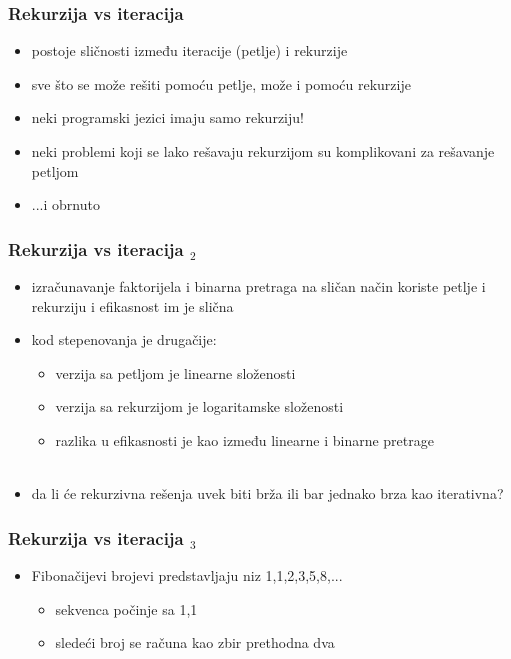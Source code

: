 \documentclass[utf8,compress]{beamer}
\begin{document}
\begin{frame}[fragile]
  \frametitle{Rekurzija vs iteracija}
  \begin{itemize}
    \item postoje sličnosti između iteracije (petlje) i rekurzije
    \item sve što se može rešiti pomoću petlje, može i pomoću rekurzije
    \item neki programski jezici imaju samo rekurziju!
    \item neki problemi koji se lako rešavaju rekurzijom su komplikovani za rešavanje petljom
    \item ...i obrnuto
  \end{itemize}
\end{frame}

\begin{frame}[fragile]
  \frametitle{Rekurzija vs iteracija $_2$}
  \begin{itemize}
    \item izračunavanje faktorijela i binarna pretraga na sličan način koriste petlje i rekurziju i efikasnost im je slična
    \item kod stepenovanja je drugačije: 
  \begin{itemize}
    \item verzija sa petljom je linearne složenosti
    \item verzija sa rekurzijom je logaritamske složenosti
    \item razlika u efikasnosti je kao između linearne i binarne pretrage \\ \ \\
  \end{itemize}
    \item da li će rekurzivna rešenja uvek biti brža ili bar jednako brza kao iterativna?
  \end{itemize}
\end{frame}

\begin{frame}[fragile]
  \frametitle{Rekurzija vs iteracija $_3$}
  \begin{itemize}
    \item Fibonačijevi brojevi predstavljaju niz 1,1,2,3,5,8,...
  \begin{itemize}
    \item sekvenca počinje sa 1,1
    \item sledeći broj se računa kao zbir prethodna dva
  \end{itemize}
  \end{itemize}
\end{frame}
\end{document}
